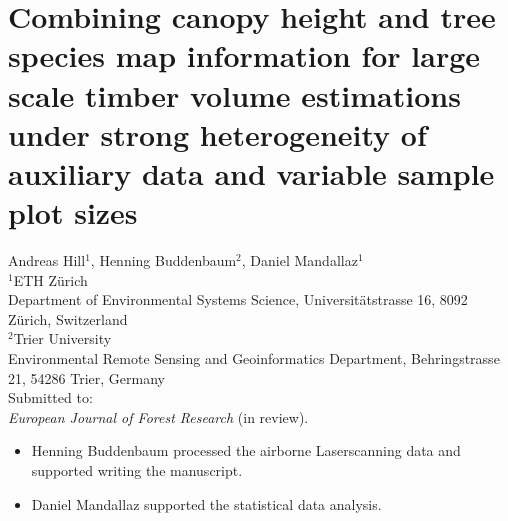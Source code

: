 \chapter{Combining canopy height and tree species map information for large scale timber volume estimations under strong heterogeneity of auxiliary data and variable sample plot sizes}
\label{chap:regmod}
{\large Andreas Hill$^1$, Henning Buddenbaum$^2$, Daniel Mandallaz$^1$}\\

\vspace{3cm}
\noindent
$^1$ETH Z\"urich\\Department of Environmental Systems Science, Universit\"atstrasse 16, 8092 Z\"urich, Switzerland \\

\noindent
$^2$Trier University\\Environmental Remote Sensing and Geoinformatics Department, Behringstrasse 21, 54286 Trier, Germany \\



\vspace{\fill}
\noindent
Submitted to:\\
\textit{European Journal of Forest Research} (in review).

\newpage
\thispagestyle{plain}
\renewcommand{\labelitemi}{--}
\begin{itemize}
	\item Henning Buddenbaum processed the airborne Laserscanning data and supported writing the manuscript.
	\item Daniel Mandallaz supported the statistical data analysis.
\end{itemize}

\clearpage
